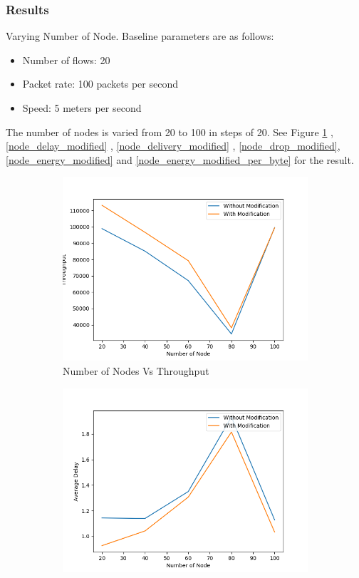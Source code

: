 \subsubsection{Results}
Varying Number of Node.
Baseline parameters are as follows:
\begin{itemize}
    \item Number of flows: 20
    \item Packet rate: 100 packets per second
    \item Speed: 5 meters per second
\end{itemize}
The number of nodes is varied from 20 to 100 in steps of 20.
See Figure \ref{node_throughput_modified} ,\ref{node_delay_modified} , \ref{node_delivery_modified} , \ref{node_drop_modified}, \ref{node_energy_modified} and \ref{node_energy_modified_per_byte}  for the result.
\begin{figure}[h]
\begin{subfigure}{.5\textwidth}
  \centering
  \includegraphics[width=.8\linewidth]{modified_fig/NumberofNodevsThroughput.png}
     \caption{Number of Nodes Vs Throughput}
    \label{node_throughput_modified}
\end{subfigure}
\begin{subfigure}{.5\textwidth}
  \centering
  \includegraphics[width=.8\linewidth]{modified_fig/NumberofNodevsAverageDelay.png}

\end{subfigure}
\end{figure}
